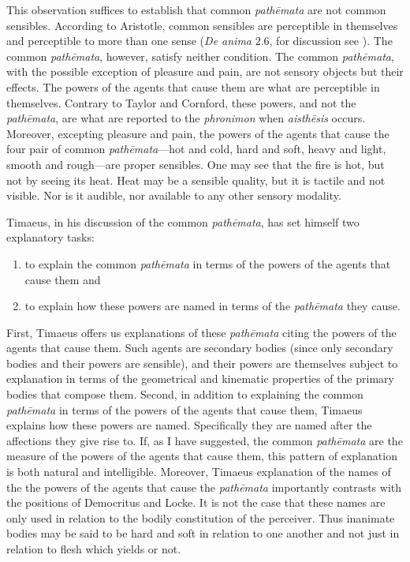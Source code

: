 This observation suffices to establish that common \emph{pathēmata} are not common sensibles. According to Aristotle, common sensibles are perceptible in themselves and perceptible to more than one sense (\emph{De anima} 2.6, for discussion see \citealt[chapter 4.2]{Kalderon:2015fr}). The common \emph{pathēmata}, however, satisfy neither condition. The common \emph{pathēmata}, with the possible exception of pleasure and pain, are not sensory objects but their effects. The powers of the agents that cause them are what are perceptible in themselves. Contrary to Taylor and Cornford, these powers, and not the \emph{pathēmata}, are what are reported to the \emph{phronimon} when \emph{aisthēsis} occurs. Moreover, excepting pleasure and pain, the powers of the agents that cause the four pair of common \emph{pathēmata}---hot and cold, hard and soft, heavy and light, smooth and rough---are proper sensibles. One may see that the fire is hot, but not by seeing its heat. Heat may be a sensible quality, but it is tactile and not visible. Nor is it audible, nor available to any other sensory modality.

Timaeus, in his discussion of the common \emph{pathēmata}, has set himself two explanatory tasks:
\begin{enumerate}[(1)]
	\item to explain the common \emph{pathēmata} in terms of the powers of the agents that cause them and
	\item to explain how these powers are named in terms of the \emph{pathēmata} they cause.
\end{enumerate}
First, Timaeus offers us explanations of these \emph{pathēmata} citing the powers of the agents that cause them. Such agents are secondary bodies (since only secondary bodies and their powers are sensible), and their powers are themselves subject to explanation in terms of the geometrical and kinematic properties of the primary bodies that compose them. Second, in addition to explaining the common \emph{pathēmata} in terms of the powers of the agents that cause them, Timaeus explains how these powers are named. Specifically they are named after the affections they give rise to. If, as I have suggested, the common \emph{pathēmata} are the measure of the powers of the agents that cause them, this pattern of explanation is both natural and intelligible. Moreover, Timaeus explanation of the names of the the powers of the agents that cause the \emph{pathēmata} importantly contrasts with the positions of Democritus and Locke. It is not the case that these names are only used in relation to the bodily constitution of the perceiver. Thus inanimate bodies may be said to be hard and soft in relation to one another and not just in relation to flesh which yields or not.

